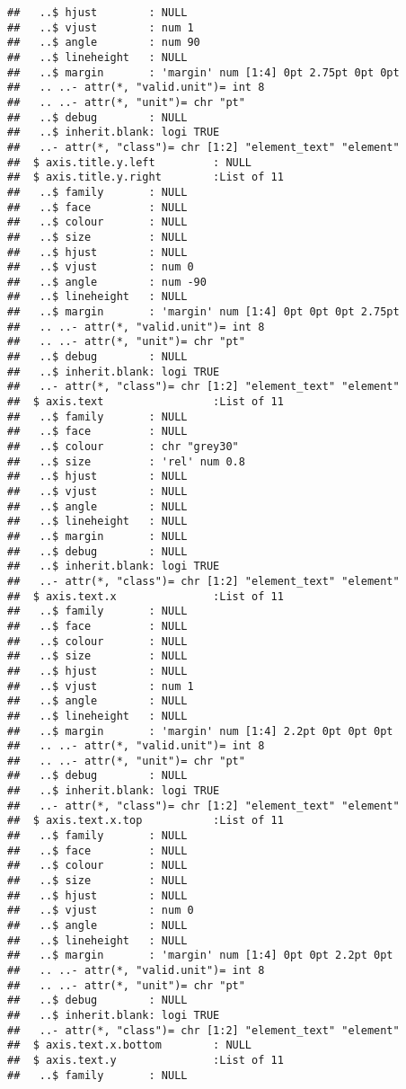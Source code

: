 \documentclass[]{article}
\begin{document}
\begin{verbatim}
##   ..$ hjust        : NULL
##   ..$ vjust        : num 1
##   ..$ angle        : num 90
##   ..$ lineheight   : NULL
##   ..$ margin       : 'margin' num [1:4] 0pt 2.75pt 0pt 0pt
##   .. ..- attr(*, "valid.unit")= int 8
##   .. ..- attr(*, "unit")= chr "pt"
##   ..$ debug        : NULL
##   ..$ inherit.blank: logi TRUE
##   ..- attr(*, "class")= chr [1:2] "element_text" "element"
##  $ axis.title.y.left         : NULL
##  $ axis.title.y.right        :List of 11
##   ..$ family       : NULL
##   ..$ face         : NULL
##   ..$ colour       : NULL
##   ..$ size         : NULL
##   ..$ hjust        : NULL
##   ..$ vjust        : num 0
##   ..$ angle        : num -90
##   ..$ lineheight   : NULL
##   ..$ margin       : 'margin' num [1:4] 0pt 0pt 0pt 2.75pt
##   .. ..- attr(*, "valid.unit")= int 8
##   .. ..- attr(*, "unit")= chr "pt"
##   ..$ debug        : NULL
##   ..$ inherit.blank: logi TRUE
##   ..- attr(*, "class")= chr [1:2] "element_text" "element"
##  $ axis.text                 :List of 11
##   ..$ family       : NULL
##   ..$ face         : NULL
##   ..$ colour       : chr "grey30"
##   ..$ size         : 'rel' num 0.8
##   ..$ hjust        : NULL
##   ..$ vjust        : NULL
##   ..$ angle        : NULL
##   ..$ lineheight   : NULL
##   ..$ margin       : NULL
##   ..$ debug        : NULL
##   ..$ inherit.blank: logi TRUE
##   ..- attr(*, "class")= chr [1:2] "element_text" "element"
##  $ axis.text.x               :List of 11
##   ..$ family       : NULL
##   ..$ face         : NULL
##   ..$ colour       : NULL
##   ..$ size         : NULL
##   ..$ hjust        : NULL
##   ..$ vjust        : num 1
##   ..$ angle        : NULL
##   ..$ lineheight   : NULL
##   ..$ margin       : 'margin' num [1:4] 2.2pt 0pt 0pt 0pt
##   .. ..- attr(*, "valid.unit")= int 8
##   .. ..- attr(*, "unit")= chr "pt"
##   ..$ debug        : NULL
##   ..$ inherit.blank: logi TRUE
##   ..- attr(*, "class")= chr [1:2] "element_text" "element"
##  $ axis.text.x.top           :List of 11
##   ..$ family       : NULL
##   ..$ face         : NULL
##   ..$ colour       : NULL
##   ..$ size         : NULL
##   ..$ hjust        : NULL
##   ..$ vjust        : num 0
##   ..$ angle        : NULL
##   ..$ lineheight   : NULL
##   ..$ margin       : 'margin' num [1:4] 0pt 0pt 2.2pt 0pt
##   .. ..- attr(*, "valid.unit")= int 8
##   .. ..- attr(*, "unit")= chr "pt"
##   ..$ debug        : NULL
##   ..$ inherit.blank: logi TRUE
##   ..- attr(*, "class")= chr [1:2] "element_text" "element"
##  $ axis.text.x.bottom        : NULL
##  $ axis.text.y               :List of 11
##   ..$ family       : NULL

\end{verbatim}
\end{document}
